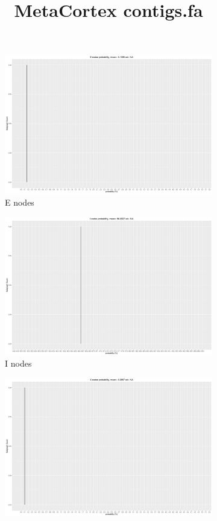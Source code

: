 \documentclass[a4paper, 12pt, oneside]{article}
\title{\large{MetaCortex contigs.fa}}
\begin{document}
\maketitle

\begin{figure}[h]
\centering
\begin{subfigure}[b]{0.45\textwidth}
\includegraphics[width=\textwidth]{graphs/E_degrees.png}
\caption{\label{fig:E}E nodes}
\end{subfigure}
\begin{subfigure}[b]{0.45\textwidth}
\includegraphics[width=\textwidth]{graphs/I_degrees.png}
\caption{\label{fig:I}I nodes }
\end{subfigure}
\begin{subfigure}[b]{0.45\textwidth}
\includegraphics[width=\textwidth]{graphs/X_degrees.png}

\end{subfigure}
\end{figure}
\end{document}
